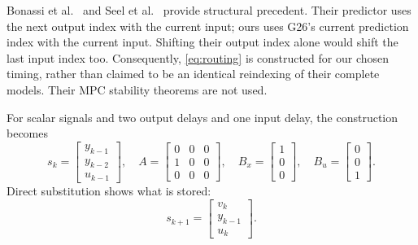 \documentclass[11pt,a4paper]{article}
\begin{document}
Bonassi et al.\ \cite[Section II, Eqs.\ (1)--(3)]{B22} and Seel et al.\ \cite[Eq.\ (2), Eqs.\ (6)--(9)]{S21} provide structural precedent. Their predictor uses the next output index with the current input; ours uses G26's current prediction index with the current input. Shifting their output index alone would shift the last input index too. Consequently, \eqref{eq:routing} is constructed for our chosen timing, rather than claimed to be an identical reindexing of their complete models. Their MPC stability theorems are not used.

For scalar signals and two output delays and one input delay, the construction becomes
\begin{equation}\label{eq:example}
s_k=\begin{bmatrix}y_{k-1}\\y_{k-2}\\u_{k-1}\end{bmatrix},\quad
A=\begin{bmatrix}0&0&0\\1&0&0\\0&0&0\end{bmatrix},\quad
B_x=\begin{bmatrix}1\\0\\0\end{bmatrix},\quad B_u=\begin{bmatrix}0\\0\\1\end{bmatrix}.
\end{equation}
Direct substitution shows what is stored:
\begin{equation}\label{eq:examplenext}
s_{k+1}=\begin{bmatrix}v_k\\y_{k-1}\\u_k\end{bmatrix}.
\end{equation}
\end{document}
